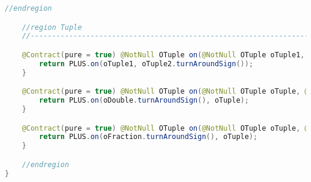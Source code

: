 \begin{lstlisting}[caption=Minus (Falk),label=list:Minus,language=Java]
    //endregion

    //region Tuple
    //------------------------------------------------------------------------------------

    @Contract(pure = true) @NotNull OTuple on(@NotNull OTuple oTuple1, @NotNull OTuple oTuple2) {
        return PLUS.on(oTuple1, oTuple2.turnAroundSign());
    }

    @Contract(pure = true) @NotNull OTuple on(@NotNull OTuple oTuple, @NotNull ODouble oDouble) {
        return PLUS.on(oDouble.turnAroundSign(), oTuple);
    }

    @Contract(pure = true) @NotNull OTuple on(@NotNull OTuple oTuple, @NotNull OFraction oFraction) {
        return PLUS.on(oFraction.turnAroundSign(), oTuple);
    }

    //endregion
}
\end{lstlisting}    

